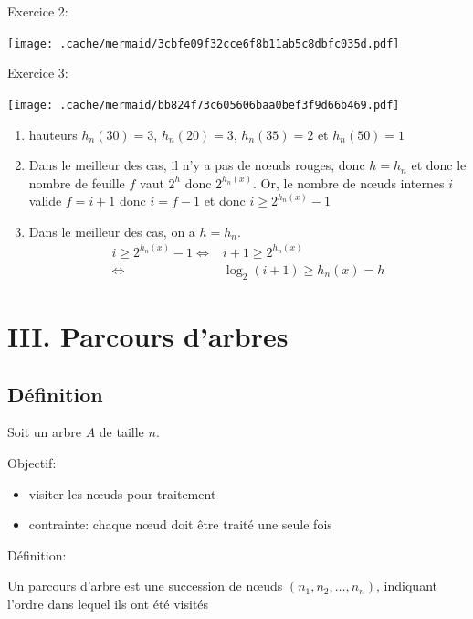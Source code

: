 Exercice 2:

\texttt{[image: .cache/mermaid/3cbfe09f32cce6f8b11ab5c8dbfc035d.pdf]}

Exercice 3:

\texttt{[image: .cache/mermaid/bb824f73c605606baa0bef3f9d66b469.pdf]}

\begin{enumerate}
\def\labelenumi{\arabic{enumi}.}
\tightlist
\item
  hauteurs \(h_n(30) = 3\), \(h_n(20) = 3\), \(h_n(35) = 2\) et
  \(h_n(50) = 1\)
\item
  Dans le meilleur des cas, il n'y a pas de nœuds rouges, donc
  \(h = h_n\) et donc le nombre de feuille \(f\) vaut \(2^h\) donc
  \(2^{h_n(x)}\). Or, le nombre de nœuds internes \(i\) valide
  \(f = i + 1\) donc \(i = f - 1\) et donc
  \(i \geqslant 2^{h_n(x)} - 1\)
\item
  Dans le meilleur des cas, on a \(h = h_n\). \begin{align*}
      i \geqslant 2^{h_n(x)} - 1 \iff&
      i + 1 \geqslant 2^{h_n(x)}\\ \iff&
      \log_2(i+1) \geqslant h_n(x) = h
  \end{align*}
\end{enumerate}

\hypertarget{iii.-parcours-darbres}{%
\section{III. Parcours d'arbres}\label{iii.-parcours-darbres}}

\hypertarget{duxe9finition}{%
\subsection{Définition}\label{duxe9finition}}

Soit un arbre \(A\) de taille \(n\).

Objectif:

\begin{itemize}
\tightlist
\item
  visiter les nœuds pour traitement
\item
  contrainte: chaque nœud doit être traité une seule fois
\end{itemize}

Définition:

Un parcours d'arbre est une succession de nœuds
\((n_1, n_2, \ldots, n_n)\), indiquant l'ordre dans lequel ils ont été
visités

